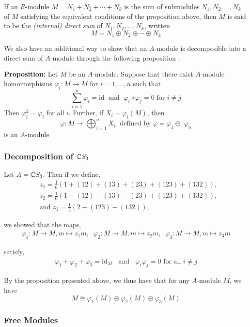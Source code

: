 \documentclass[11pt, reqno]{amsart}
\theoremstyle{plain}
\theoremstyle{definition}
\theoremstyle{example}
\def\id{\mathrm{id}}
\begin{document}
If an $R$-module $M = N_1 + N_2 + \cdots + N_k$ is the sum of submodules $N_1, N_2, \ldots, N_k$ of $M$ satisfying the equivalent conditions of the proposition above, then $M$ is said to be the \textit{(internal) direct sum} of $N_1, N_2, \ldots, N_k$, written $$M = N_1 \oplus N_2 \oplus \cdots \oplus N_k$$

We also have an additional way to show that an $A$-module is decomposible into a direct sum of $A$-module through the following proposition \cite[Lec 11, p. 2]{dau}:

\par
\textbf{Proposition:} Let $M$ be an $A$-module. Suppose that there exist $A$-module homomorphisms $\varphi_i: M \to M$ for $i = 1, \ldots, n$ such that $$\sum_{i=1}^n \varphi_i = \id \; \text{ and } \; \varphi_i \circ \varphi_j = 0 \text{ for } i \neq j$$ Then $\varphi_i^2 = \varphi_i$ for all $i$. Further, if $X_i = \varphi_i(M)$, then $$\varphi: M \to \bigoplus_{i=1}^n X_i \; \text{ defined by } \varphi = \varphi_1 \oplus \cdot \varphi_n$$ is an $A$-module 

\subsubsection{Decomposition of $\mathbb{C} S_3$}

Let $A = \mathbb{C} S_3$. Then if we define, 
\begin{align*}
&z_1 = \frac{1}{6}(1 + (12) + (13) + (23) + (123) + (132)),\\
&z_2 = \frac{1}{6}(1 - (12) - (13) - (23) + (123) + (132)),\\
&\text{and } z_3 = \frac{1}{3}(2 - (123) - (132)),
\end{align*}

we showed that the maps,
\begin{align*}
\varphi_1: M \to M, m \mapsto z_1m, \; \; \varphi_2: M \to M, m \mapsto z_2m, \; \; \varphi_3: M \to M, m \mapsto z_3m
\end{align*}

satisfy,
\begin{align*}
\varphi_1 + \varphi_2 + \varphi_3 = \id_M \; \; \text{ and } \; \; \varphi_i \varphi_j = 0 \text{ for all } i \neq j
\end{align*}

By the proposition presented above, we thus have that for any $A$-module $M$, we have $$M \cong \varphi_1(M) \oplus \varphi_2(M) \oplus \varphi_3(M)$$

\subsubsection{Free Modules}
\end{document}

